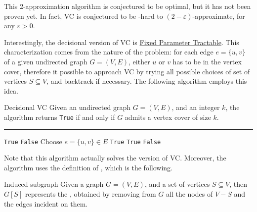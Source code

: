 \documentclass[a4paper, 12pt]{report}
\begin{document}
    This 2-approximation algorithm is conjectured to be optimal, but it has not been proven yet. In fact, VC is conjectured to be \NPclass-hard to $(2 - \varepsilon)$-approximate, for any $\varepsilon > 0$.

    Interestingly, the decisional version of VC is \href{https://en.wikipedia.org/wiki/Parameterized_complexity#FPT}{Fixed Parameter Tractable}. This characterization comes from the nature of the problem: for each edge $e = \{u, v\}$ of a given undirected graph $G = (V, E)$, either $u$ or $v$ has to be in the vertex cover, therefore it possible to approach VC by trying all possible choices of set of vertices $S \subseteq V$, and backtrack if necessary. The following algorithm employs this idea.

    \begin{framedalgo}{Decisional VC}
        Given an undirected graph $G = (V, E)$, and an integer $k$, the algorithm returns \texttt{True} if and only if $G$ admits a vertex cover of size $k$. \\
        \hrule

        \quad
        \begin{algorithmic}[1]
                    \State {} \texttt{True}
                    \State {} \texttt{False}
                \Else
                    \State Choose $e = \{u, v\} \in E$
                        \State {} \texttt{True}
                    \EndIf
                        \State {} \texttt{True}
                    \EndIf
                    \State {} \texttt{False}
                \EndIf
            \EndFunction
        \end{algorithmic}
    \end{framedalgo}

    Note that this algorithm actually solves the  version of VC. Moreover, the algorithm uses the definition of , which is the following.

    \begin{frameddefn}{Induced subgraph}
        Given a graph $G = (V, E)$, and a set of vertices $S \subseteq V$, then $G[S]$ represents the , obtained by removing from $G$ all the nodes of $V - S$ and the edges incident on them.
    \end{frameddefn}
\end{document}
